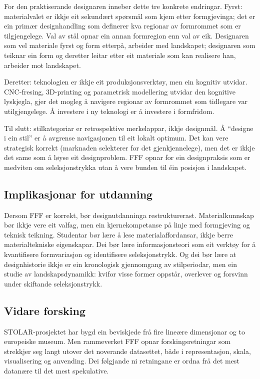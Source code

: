\documentclass[10pt, a4paper, twocolumn]{article}
\begin{document}
For den praktiserande designaren inneber dette tre konkrete endringar. Fyrst: materialvalet er ikkje eit sekundært spørsmål som kjem etter formgjevinga; det er ein primær designhandling som definerer kva regionar av formrommet som er tilgjengelege. Val av stål opnar ein annan formregion enn val av eik. Designaren som vel materiale fyrst og form etterpå, arbeider med landskapet; designaren som teiknar ein form og deretter leitar etter eit materiale som kan realisere han, arbeider mot landskapet.

Deretter: teknologien er ikkje eit produksjonsverktøy, men ein kognitiv utvidar. CNC-fresing, 3D-printing og parametrisk modellering utvidar den kognitive lyskjegla, gjer det mogleg å navigere regionar av formrommet som tidlegare var utilgjengelege. Å investere i ny teknologi er å investere i formfridom.

Til slutt: stilkategoriar er retrospektive merkelappar, ikkje designmål. Å ``designe i ein stil'' er å avgrense navigasjonen til eit lokalt optimum. Det kan vere strategisk korrekt (marknaden selekterer for det gjenkjennelege), men det er ikkje det same som å løyse eit designproblem. FFF opnar for ein designpraksis som er medviten om seleksjonstrykka utan å vere bunden til éin posisjon i landskapet.

\subsection{Implikasjonar for utdanning}

Dersom FFF er korrekt, bør designutdanninga restrukturerast. Materialkunnskap bør ikkje vere eit valfag, men ein kjernekompetanse på linje med formgjeving og teknisk teikning. Studentar bør lære å lese materialaffordansar, ikkje berre materialtekniske eigenskapar. Dei bør lære informasjonsteori som eit verktøy for å kvantifisere formvariasjon og identifisere seleksjonstrykk. Og dei bør lære at designhistorie ikkje er ein kronologisk gjennomgang av stilperiodar, men ein studie av landskapsdynamikk: kvifor visse former oppstår, overlever og forsvinn under skiftande seleksjonstrykk.

\subsection{Vidare forsking}

STOLAR-prosjektet har bygd ein beviskjede frå fire lineære dimensjonar og to europeiske museum. Men rammeverket FFF opnar forskingsretningar som strekkjer seg langt utover det noverande datasettet, både i representasjon, skala, visualisering og anvending. Dei følgjande ni retningane er ordna frå det mest datanære til det mest spekulative.
\end{document}
